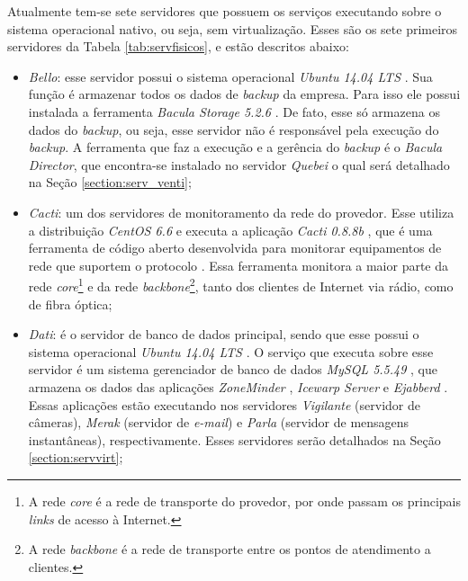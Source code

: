 Atualmente tem-se sete servidores que possuem os serviços executando sobre o sistema operacional nativo, ou seja, sem virtualização. 
Esses são os sete primeiros servidores da Tabela \ref{tab:servfisicos}, e estão descritos abaixo:
\begin{itemize}
 \item \textit{Bello}: esse servidor possui o sistema operacional \textit{Ubuntu 14.04 \ac{LTS}} \cite{ubuntu}. Sua função é armazenar todos os 
 dados de \textit{backup} da empresa. Para isso ele possui instalada a ferramenta \textit{Bacula Storage 5.2.6} \cite{bacula}. De fato, esse só
 armazena os dados do \textit{backup}, ou seja, esse servidor não é responsável pela execução do \textit{backup}. A ferramenta que faz a execução e
 a gerência do \textit{backup} é o \textit{Bacula Director}, que encontra-se instalado no servidor \textit{Quebei} o qual será detalhado na 
 Seção \ref{section:serv_venti};
 
 \item \textit{Cacti}: um dos servidores de monitoramento da rede do provedor. Esse utiliza a distribuição \textit{CentOS 6.6} \cite{centos} e 
 executa a aplicação \textit{Cacti 0.8.8b} \cite{cacti}, que é uma ferramenta de código aberto desenvolvida para monitorar equipamentos de rede 
 que suportem o protocolo  \cite{kurose2006}. Essa ferramenta monitora a maior parte da rede 
 \textit{core}\footnote[1]{A rede \textit{core} é a rede de transporte do provedor, por onde passam os principais \textit{links} de acesso à 
 Internet.} e da rede \textit{backbone}\footnote[2]{A rede \textit{backbone} é a rede de transporte entre os pontos de atendimento a clientes.}, 
 tanto dos clientes de Internet via rádio, como de fibra óptica;
 
 \item \textit{Dati}: é o servidor de banco de dados principal, sendo que esse possui o sistema operacional \textit{Ubuntu 14.04 \ac{LTS}} 
 \cite{ubuntu}. O serviço que executa sobre esse servidor é um sistema gerenciador de banco de dados \textit{MySQL 5.5.49} \cite{mysql}, que 
 armazena os dados das aplicações \textit{ZoneMinder} \cite{zoneminder}, \textit{Icewarp Server} \cite{icewarp} e \textit{Ejabberd} \cite{ejabberd}. 
 Essas aplicações estão executando nos servidores \textit{Vigilante} (servidor de câmeras), \textit{Merak} (servidor de \textit{e-mail}) e 
 \textit{Parla} (servidor de mensagens instantâneas), respectivamente. Esses servidores serão detalhados na Seção \ref{section:servvirt};
 

\end{itemize}

